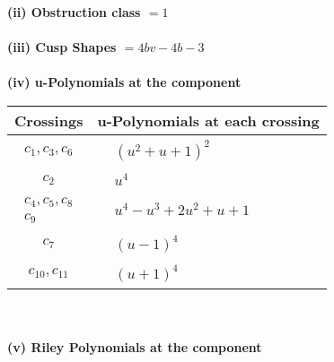 \documentclass[1p]{elsarticle_modified}
\theoremstyle{definition}
\begin{document}
\flushleft \textbf{(ii) Obstruction class $= 1$}\\~\\
\flushleft \textbf{(iii) Cusp Shapes $= 4 b v-4 b-3$}\\~\\
\newpage\renewcommand{\arraystretch}{1}
\flushleft \textbf{(iv) u-Polynomials at the component}\newline \\
\begin{tabular}{m{50pt}|m{274pt}}
Crossings & \hspace{64pt}u-Polynomials at each crossing \\
\hline $$\begin{aligned}c_{1},c_{3},c_{6}\end{aligned}$$&$\begin{aligned}
&(u^2+u+1)^2
\end{aligned}$\\
\hline $$\begin{aligned}c_{2}\end{aligned}$$&$\begin{aligned}
&u^4
\end{aligned}$\\
\hline $$\begin{aligned}c_{4},c_{5},c_{8}\\c_{9}\end{aligned}$$&$\begin{aligned}
&u^4- u^3+2 u^2+u+1
\end{aligned}$\\
\hline $$\begin{aligned}c_{7}\end{aligned}$$&$\begin{aligned}
&(u-1)^4
\end{aligned}$\\
\hline $$\begin{aligned}c_{10},c_{11}\end{aligned}$$&$\begin{aligned}
&(u+1)^4
\end{aligned}$\\
\hline
\end{tabular}\\~\\
\newpage\renewcommand{\arraystretch}{1}
\flushleft \textbf{(v) Riley Polynomials at the component}\newline \\
\end{document}
